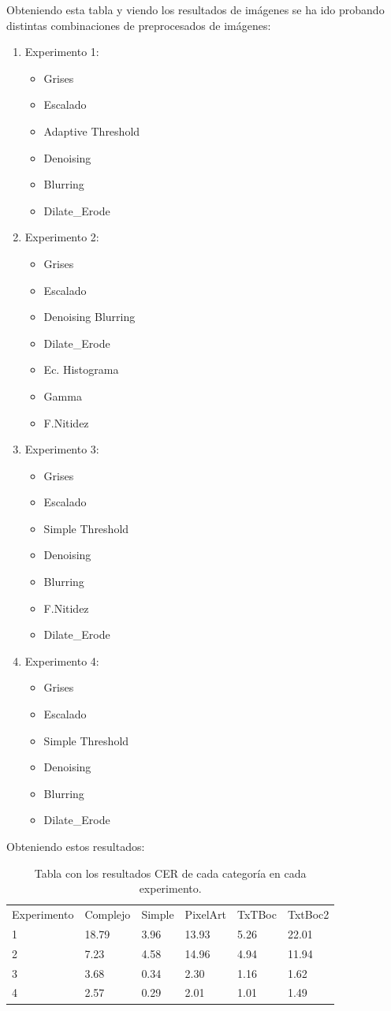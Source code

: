 Obteniendo esta tabla y viendo los resultados de imágenes se ha ido probando distintas combinaciones de preprocesados de imágenes:
\begin{enumerate}
	\item Experimento 1: 
	\begin{itemize}
		\item Grises \item Escalado\item Adaptive Threshold \item Denoising \item Blurring \item Dilate\_Erode    
	\end{itemize}
		\item Experimento 2: 
	\begin{itemize}
		\item Grises\item Escalado\item Denoising Blurring  \item Dilate\_Erode\item Ec. Histograma \item Gamma \item F.Nitidez           
	\end{itemize}
		\item Experimento 3: 
	\begin{itemize}
		\item Grises \item Escalado\item Simple Threshold \item Denoising \item Blurring \item F.Nitidez \item Dilate\_Erode    
	\end{itemize}
		\item Experimento 4: 
	\begin{itemize}
		\item Grises \item Escalado\item Simple Threshold \item Denoising \item Blurring \item Dilate\_Erode    
	\end{itemize}
\end{enumerate}
Obteniendo estos resultados:
\begin{table}[H]
	\begin{tabular}{llllll}
		Experimento & Complejo & Simple & PixelArt & TxTBoc & TxtBoc2                      \\
		 1 & 18.79     & 3.96   & 13.93     & 5.26   & 22.01 \\
		 2 & 7.23     & 4.58   & 14.96     & 4.94   & 11.94 \\
		 3 & 3.68     & 0.34   & 2.30     & 1.16   & 1.62 \\
		 4 & 2.57     & 0.29   & 2.01     & 1.01   & 1.49
	\end{tabular}
	\caption{Tabla con los resultados CER de cada categoría en cada experimento.}
	\label{table:Prepro}
\end{table}

